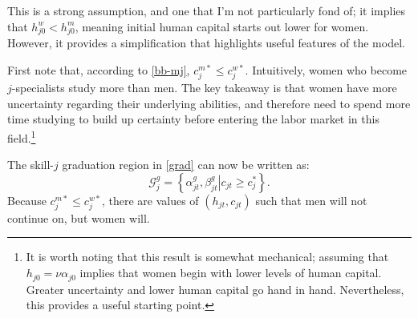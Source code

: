 \documentclass[10 pt]{article}
\begin{document}
\begin{outline}



This is a strong assumption, and one that I'm not particularly fond of; it implies that $h_{j0}^w < h_{j0}^m$, meaning initial human capital starts out lower for women. 
However, it provides a simplification that highlights useful features of the model. 

\begin{blist}

\item First note that, according to \eqref{bb-mj}, $c_j^{m*} \leq c_j^{w*}$. 
Intuitively, women who become $j$-specialists study more than men. 
The key takeaway is that women have more uncertainty regarding their underlying abilities, and therefore need to spend more time studying to build up certainty before entering the labor market in this field.\footnote{
   It is worth noting that this result is somewhat mechanical; assuming that $h_{j0} = \nu \alpha_{j0}$ implies that women begin with lower levels of human capital.
   Greater uncertainty and lower human capital go hand in hand. 
   Nevertheless, this provides a useful starting point.

}   


\item The skill-$j$ graduation region in \eqref{grad} can now be written as:
\begin{equation*}
	\mathcal{G}_j^g = \left\{ \alpha_{jt}^g, \beta_{jt}^g \left\vert c_{jt} \geq c_j^* \right. \right\}.
\end{equation*}
Because $c_j^{m*} \leq c_j^{w*}$, there are values of $(h_{jt}, c_{jt})$ such that men will not continue on, but women will. 



\end{blist}
\end{outline}
\end{document}

